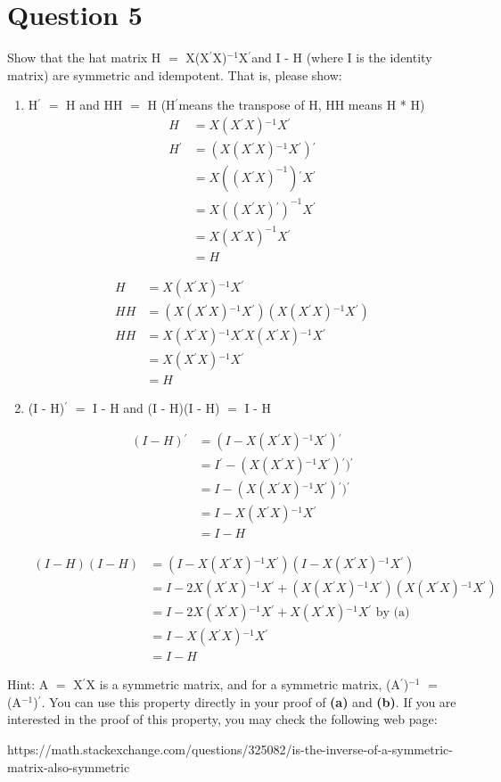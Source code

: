 \documentclass{article}
\newcommand{\mt}[1]{\ensuremath{#1}}
\newcommand\bsc[2][\DefaultOpt]{%
  \def\DefaultOpt{#2}%
  \section[#1]{#2}%
}
\newcommand{\balist}{\begin{enumerate}[label=\alph*.]}
\newcommand{\elist}{\end{enumerate}}
\newcommand{\bpth}[1]{\textbf{(#1)}}
\newcommand{\ms}{\mt{\operatorname{-}} }
\newcommand{\eql}{ \mt{\operatorname{=}} }
\newcommand{\pr}{\mt{^\prime}} 		   %
\newcommand{\uf}[2]{#1\mt{^{#2}}}
\newcommand{\eqn}[1]{\[#1\]}
\newcommand{\splt}[1]{\begin{split}#1\end{split}}
\newcommand{\txt}[1]{\text{#1}} %
\begin{document}
\bsc{Question 5}{
Show that the hat matrix H \eql X\uf{(X\pr X)}{-1}X\pr and I \ms H (where I is the identity matrix) are symmetric and idempotent. That is, please show:
\balist
\item H\pr \eql H and HH \eql H (H\pr\txt{ }means the transpose of H, HH means H * H)
	\eqn{
		\splt{
			H & = X\uf{(X\pr X)}{-1}X\pr \\
			H\pr & = (X\uf{(X\pr X)}{-1}X\pr)\pr \\
			& = X((X\pr X)^{-1})\pr X\pr \\
			& = X((X\pr X)\pr)^{-1}X\pr \\
			& = X(X\pr X)^{-1}X\pr \\
			& = H
		}
	}
	
	\eqn{
		\splt{
			H & = X\uf{(X\pr X)}{-1}X\pr \\
			HH & = (X\uf{(X\pr X)}{-1}X\pr)(X\uf{(X\pr X)}{-1}X\pr) \\
			HH & = X\uf{(X\pr X)}{-1}X\pr  X\uf{(X\pr X)}{-1}X\pr \\
			& = X\uf{(X\pr X)}{-1}X\pr \\
			& = H
		}
	}
\item (I \ms H)\pr \eql I \ms H and (I \ms H)(I \ms H) \eql I \ms H
	
	\eqn{
		\splt{
			(I - H)\pr & = (I - X\uf{(X\pr X)}{-1}X\pr)\pr \\
			& = I\pr - (X\uf{(X\pr X)}{-1}X\pr)\pr)\pr \\
			& = I - (X\uf{(X\pr X)}{-1}X\pr)\pr)\pr \\
			& = I - X\uf{(X\pr X)}{-1}X\pr \\
			& = I - H
		}
	}
	
	\eqn{
		\splt{
			(I - H)(I - H) & = (I - X\uf{(X\pr X)}{-1}X\pr)(I - X\uf{(X\pr X)}{-1}X\pr) \\
			& = I - 2X\uf{(X\pr X)}{-1}X\pr + (X\uf{(X\pr X)}{-1}X\pr)(X\uf{(X\pr X)}{-1}X\pr) \\
			& = I - 2X\uf{(X\pr X)}{-1}X\pr + X\uf{(X\pr X)}{-1}X\pr \txt{ by (a)} \\
			& = I - X\uf{(X\pr X)}{-1}X\pr \\
			& = I - H
		}
	}
\elist

Hint: A\eql X\pr X is a symmetric matrix, and for a symmetric matrix, \uf{(A\pr)}{-1} \eql (\uf{A}{-1})\pr. You can use this property directly in your proof of \bpth{a} and \bpth{b}. If you are interested in the proof of this property, you may check the following web page:

https://math.stackexchange.com/questions/325082/is-the-inverse-of-a-symmetric-matrix-also-symmetric

}
\end{document}

